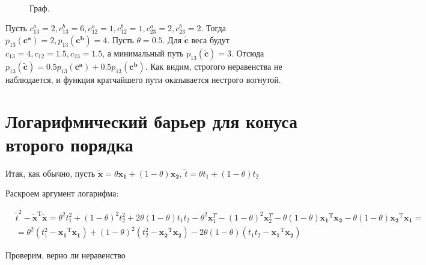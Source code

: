 	\begin{figure}[H]
		\\
		\caption{Граф.}
	\end{figure}
	
	Пусть $c_{13}^a = 2, c_{13}^b = 6, c_{12}^a = 1, c_{12}^b = 1, c_{23}^a = 2,
	c_{23}^b = 2$. Тогда $p_{13}(\mathbf{c^a}) = 2, p_{13}(\mathbf{c^b}) = 4$. Пусть
	$\theta = 0.5$. Для $\mathbf{\tilde{c}}$ веса будут $c_{13} = 4, c_{12} = 1.5,
	c_{23} = 1.5$, а минимальный путь $p_{13}(\mathbf{\tilde{c}}) = 3$. Отсюда
	$p_{13}(\mathbf{\tilde{c}}) = 0.5 p_{13}(\mathbf{c^a}) + 0.5
	p_{13}(\mathbf{c^b}) $. Как видим, строгого неравенства не наблюдается, и
	функция кратчайшего пути оказывается нестрого вогнутой.
	
	\section{Логарифмический барьер для конуса второго порядка}
	
	Итак, как обычно, пусть $\mathbf{\tilde{x}} = \theta \mathbf{x_1} +  (1 -
	\theta) \mathbf{x_2}$, $\tilde{t} = \theta t_1 + (1 - \theta) t_2$
	
	Раскроем аргумент логарифма:
	
	\begin{equation}
	\begin{split}
	&\tilde{t}^2 - \mathbf{\tilde{x}}^\text{T} \mathbf{\tilde{x}} = \theta^2 t_1^2
	+ (1-\theta)^2 t_2^2 + 2\theta(1-\theta)t_1 t_2 - \theta^2 \mathbf{x}_1^{T} -(1-
	\theta)^2 \mathbf{x}_2^{T} - \theta (1- \theta)\mathbf{x_1}^\text{T}
	\mathbf{x_2} - \theta (1- \theta)\mathbf{x_2}^\text{T} \mathbf{x_1} = \\
	&=\theta^2(t_1^2 - \mathbf{x_1}^\text{T} \mathbf{x_1}) + (1-\theta)^2(t_2^2 -
	\mathbf{x_2}^\text{T} \mathbf{x_2}) - 2\theta (1-\theta)(t_1 t_2 -
	\mathbf{x_1}^\text{T} \mathbf{x_2})
	\end{split}
	\end{equation}
	
	Проверим, верно ли неравенство
	
